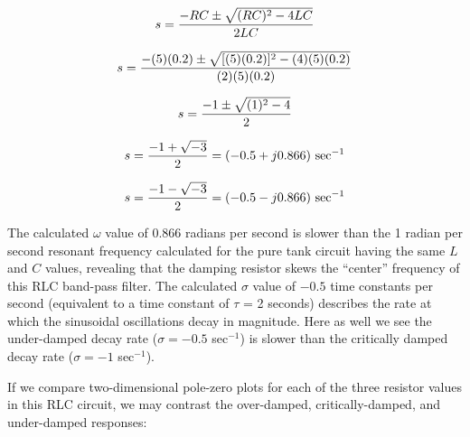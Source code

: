 $$s = {{-RC \pm \sqrt{(RC)^2 - 4LC}} \over 2LC}$$ 

$$s = {{-(5)(0.2) \pm \sqrt{[(5)(0.2)]^2 - (4)(5)(0.2)}} \over (2)(5)(0.2)}$$ 

$$s = {{-1 \pm \sqrt{(1)^2 - 4}} \over 2}$$ 

$$s = {{-1 + \sqrt{-3}} \over 2} = (-0.5 + j0.866) \hbox{ sec}^{-1}$$ 

$$s = {{-1 - \sqrt{-3}} \over 2} = (-0.5 - j0.866) \hbox{ sec}^{-1}$$

The calculated $\omega$ value of 0.866 radians per second is slower than the 1 radian per second resonant frequency calculated for the pure tank circuit having the same $L$ and $C$ values, revealing that the damping resistor skews the ``center'' frequency of this RLC band-pass filter.  The calculated $\sigma$ value of $-0.5$ time constants per second (equivalent to a time constant of $\tau$ = 2 seconds) describes the rate at which the sinusoidal oscillations decay in magnitude.  Here as well we see the under-damped decay rate ($\sigma = -0.5$ sec$^{-1}$) is slower than the critically damped decay rate ($\sigma = -1$ sec$^{-1}$).

\vskip 10pt

If we compare two-dimensional pole-zero plots for each of the three resistor values in this RLC circuit, we may contrast the over-damped, critically-damped, and under-damped responses:

